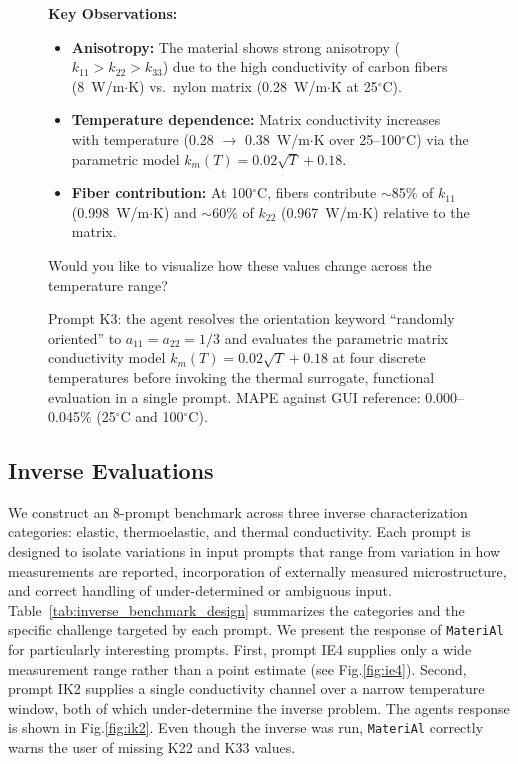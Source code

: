 \documentclass[preprint,review,10pt,number]{elsarticle}
\begin{document}
\begin{figure}[h]
\begin{tcolorbox}
\begin{tcolorbox}
\textbf{Key Observations:}
\begin{itemize}[leftmargin=1.2em, itemsep=0pt, topsep=2pt]
\item \textbf{Anisotropy:} The material shows strong anisotropy 
($k_{11} > k_{22} > k_{33}$) due to the high conductivity of carbon 
fibers (8~W/m$\cdot$K) vs.\ nylon matrix (0.28~W/m$\cdot$K at 
25$^\circ$C).
\item \textbf{Temperature dependence:} Matrix conductivity increases 
with temperature (0.28 $\rightarrow$ 0.38~W/m$\cdot$K over 
25--100$^\circ$C) via the parametric model $k_m(T) = 
0.02\sqrt{T} + 0.18$.
\item \textbf{Fiber contribution:} At 100$^\circ$C, fibers 
contribute $\sim$85\% of $k_{11}$ (0.998~W/m$\cdot$K) and 
$\sim$60\% of $k_{22}$ (0.967~W/m$\cdot$K) relative to the matrix.
\end{itemize}
\vspace{4pt}
Would you like to visualize how these values change across the 
temperature range?
\end{tcolorbox}
\end{tcolorbox}
\caption{Prompt K3: the agent resolves the orientation keyword ``randomly oriented'' to $a_{11}=a_{22}=1/3$ and evaluates the parametric matrix conductivity model $k_m(T) = 0.02\sqrt{T}+0.18$ at four discrete temperatures before invoking the thermal surrogate, 
functional evaluation in a single prompt. MAPE against GUI reference: 
0.000--0.045\% (25$^\circ$C and 100$^\circ$C).}
\label{fig:k3}
\end{figure}





\subsection{Inverse Evaluations}

We construct an 8-prompt benchmark across three inverse characterization categories:
elastic, thermoelastic, and thermal conductivity.
Each prompt is designed to isolate variations in input prompts that range from variation in how measurements are reported, incorporation of externally measured microstructure, and correct handling of under-determined or ambiguous input.
Table~\ref{tab:inverse_benchmark_design} summarizes the categories and the specific challenge targeted by each prompt. 
We present the response of \texttt{MateriAl} for particularly interesting prompts.
First, prompt IE4 supplies only a wide measurement range rather than a point estimate (see Fig.\ref{fig:ie4}). 
Second, prompt IK2 supplies a single conductivity channel over a narrow temperature window, both of which under-determine the inverse problem. The agents response is shown in Fig.\ref{fig:ik2}.
Even though the inverse was run, \texttt{MateriAl} correctly warns the user of missing K22 and K33 values.
\end{document}
